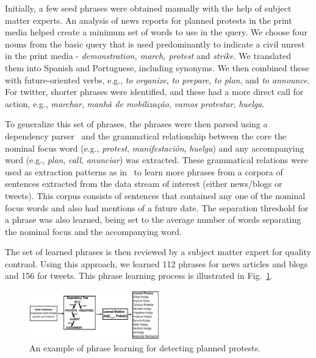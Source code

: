 Initially, a few seed phrases were obtained manually
with the help of subject matter experts.
An analysis of news reports for planned protests in the print media helped create a
minimum set of words to use in the query.  We choose four nouns from
the basic query that is used predominantly to indicate a civil unrest
in the print media - {\em demonstration, march, protest} and
{\it strike}. We translated them into Spanish and Portuguese, including
synonyms.  We then combined these with future-oriented verbs, e.g., {\em to organize}, {\em to prepare}, {\em to
plan}, and {\em to announce}. For twitter, shorter phrases were identified, and these had
a more direct call for action, e.g., {\em marchar}, {\em manhã de mobilização}, {\em
  vamos protestar}, {\em huelga}.

To generalize this set of phrases, the phrases were then parsed
using a dependency parser~\cite{freeling} and the grammatical
relationship between the core the nominal focus word (e.g., {\em protest}, 
{\em manifestación}, {\em huelga}) and any accompanying
word (e.g., {\em plan}, {\em call}, {\em anunciar}) was
extracted. These grammatical relations were used as extraction
patterns as in~\cite{riloff2003learning} to learn more phrases from a
corpora of sentences extracted from the data stream of interest
(either news/blogs or tweets). This corpus consists of sentences that
contained any one of the nominal focus words and also had mentions of
a future date. The separation threshold for a phrase was also
learned, being set to the average number of words separating
the nominal focus and the accompanying word.

The set of learned phrases is then reviewed by a subject matter expert for quality contraol.  
Using this approach, we learned 112 phrases for news articles and blogs and 156 for tweets.  
This phrase learning process is illustrated in Fig.~\ref{fig:phraselearning}.

\begin{figure}
\includegraphics[width=0.5\textwidth]{figures/phraseLearning}
\vspace{-2em}
\caption{An example of phrase learning for detecting planned protests.}
\label{fig:phraselearning}
\end{figure}

